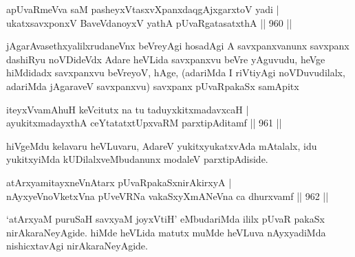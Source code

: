 \begin{shl}
apUvaRmeVva saM pasheyxVtasxvXpanxdaqgAjxgarxtoV yadi | \\
ukatxsavxponxV BaveVdanoyxV yathA pUvaRgatasatxthA \hfill||  960 ||  
\end{shl}

\begin{artha}
jAgarAvasethxyalilxrudaneVnx beVreyAgi hosadAgi A savxpanxvanunx savxpanx dashiRyu noVDideVdx Adare heVLida savxpanxvu beVre yAguvudu, heVge hiMdidadx savxpanxvu beVreyoV, hAge, (adariMda I riVtiyAgi noVDuvudilalx, adariMda jAgaraveV savxpanxvu) 
savxpanx pUvaRpakaSx samApitx
\end{artha}

\begin{shl}
iteyxVvamAhuH keVcitutx na tu taduyxkitxmadavxcaH | \\
ayukitxmadayxthA ceYtatatxtUpxvaRM parxtipAditamf \hfill||  961 ||  
\end{shl}

\begin{artha}
hiVgeMdu kelavaru heVLuvaru, AdareV yukitxyukatxvAda mAtalalx, idu yukitxyiMda kUDilalxveMbudanunx modaleV parxtipAdiside.
\end{artha}


\begin{shl}
atArxyamitayxneVnAtarx pUvaRpakaSxnirAkirxyA | \\
nAyxyeVnoVketxVna pUveVRNa vakaSxyXmANeVna ca dhurxvamf \hfill||  962 ||  
\end{shl}

\begin{artha}
`atArxyaM puruSaH savxyaM joyxVtiH' eMbudariMda ililx pUvaR pakaSx nirAkaraNeyAgide. hiMde heVLida matutx muMde heVLuva nAyxyadiMda nishicxtavAgi nirAkaraNeyAgide.
\end{artha}
